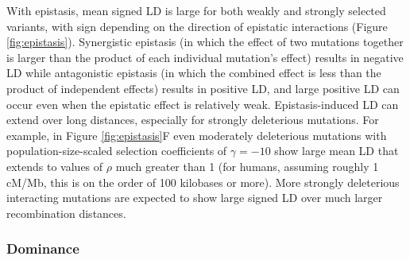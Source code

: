 \documentclass[]{article}
\begin{document}
With epistasis, mean signed LD is large for both weakly and strongly selected
variants, with sign depending on the direction of epistatic interactions
(Figure \ref{fig:epistasis}).
Synergistic epistasis (in which the effect of two mutations together is larger than
the product of each individual mutation's effect) results in negative LD while
antagonistic epistasis (in which the combined effect is less than the product of
independent effects) results in positive LD, and large positive LD can occur
even when the epistatic effect is relatively weak. Epistasis-induced LD can
extend over long distances, especially for strongly deleterious mutations. For
example, in Figure \ref{fig:epistasis}F even moderately deleterious mutations with
population-size-scaled selection coefficients of \(\gamma=-10\) show large mean
LD that extends to values of \(\rho\) much greater than 1 (for humans, assuming
roughly 1 cM/Mb, this is on the order of 100 kilobases or more).
More strongly deleterious interacting mutations are expected to show large
signed LD over much larger recombination distances.

\subsubsection{Dominance}\label{sec:dominance}
\end{document}
